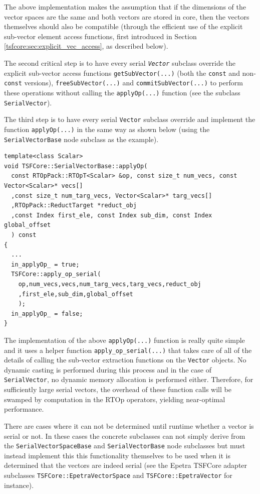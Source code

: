{}\noindent{}The above implementation makes the assumption that if the
dimensions of the vector spaces are the same and both vectors are
stored in core, then the vectors themselves should also be compatible
(through the efficient use of the explicit sub-vector element access
functions, first introduced in Section
{}\ref{tsfcore:sec:explicit_vec_access}, as described below).

The second critical step is to have every serial
{}\texttt{\textit{Vector}} subclass override the explicit sub-vector
access functions {}\texttt{getSubVector(...)} (both the {}\texttt{const}
and non-\texttt{const} versions), {}\texttt{free\-Sub\-Vector(...)} 
and {}\texttt{commit\-Sub\-Vector(...)} to perform these operations
without calling the {}\texttt{applyOp(\-...)} function (see the subclass
{}\texttt{SerialVector}).

The third step is to have every serial {}\texttt{Vector} subclass
override and implement the function {}\texttt{applyOp(\-...)} in the
same way as shown below (using the {}\texttt{SerialVectorBase} node
subclass as the example).

{\scriptsize\begin{verbatim}
template<class Scalar>
void TSFCore::SerialVectorBase::applyOp(
  const RTOpPack::RTOpT<Scalar> &op, const size_t num_vecs, const Vector<Scalar>* vecs[]
  ,const size_t num_targ_vecs, Vector<Scalar>* targ_vecs[]
  ,RTOpPack::ReductTarget *reduct_obj
  ,const Index first_ele, const Index sub_dim, const Index global_offset
  ) const
{
  ...
  in_applyOp_ = true;
  TSFCore::apply_op_serial(
    op,num_vecs,vecs,num_targ_vecs,targ_vecs,reduct_obj
    ,first_ele,sub_dim,global_offset
    );
  in_applyOp_ = false;
}
\end{verbatim}}

{}\noindent{}The implementation of the above {}\texttt{applyOp(\-...)}
function is really quite simple and it uses a helper function
{}\texttt{apply\_op\_serial(...)}  that takes care of all of the
details of calling the sub-vector extraction functions on the
{}\texttt{Vector} objects.  No dynamic casting is performed during
this process and in the case of {}\texttt{SerialVector}, no dynamic
memory allocation is performed either.  Therefore, for sufficiently
large serial vectors, the overhead of these function calls will be
swamped by computation in the RTOp operators, yielding near-optimal
performance.

There are cases where it can not be determined until runtime whether a
vector is serial or not.  In these cases the concrete subclasses can
not simply derive from the {}\texttt{Serial\-VectorSpace\-Base} and
{}\texttt{SerialVectorBase} node subclasses but must instead implement
this this functionality themselves to be used when it is determined
that the vectors are indeed serial (see the Epetra TSFCore adapter
subclasses {}\texttt{TSFCore::EpetraVectorSpace} and
{}\texttt{TSFCore::EpetraVector} for instance).

